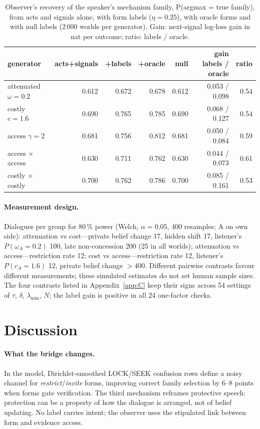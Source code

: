 \documentclass[runningheads]{llncs}
\begin{document}
\begin{table}[t]
\centering\caption{Observer's recovery of the speaker's mechanism family, P(argmax = true family), from acts and signals alone, with form labels ($\eta=0.25$), with oracle forms and with null labels (2\,000 worlds per generator). Gain: next-signal log-loss gain in nat per outcome; ratio: labels / oracle.}
\label{tab:labels_gain}
\footnotesize
\begin{tabular}{@{}lrrrrrr@{}}
\toprule
generator & acts+signals & +labels & +oracle & null & gain labels / oracle & ratio\\
\midrule
attenuated $\omega{=}0.2$ & 0.612 & 0.672 & 0.678 & 0.612 & 0.053 / 0.098 & 0.54\\
costly $c{=}1.6$ & 0.690 & 0.765 & 0.785 & 0.690 & 0.068 / 0.127 & 0.54\\
access $\gamma{=}2$ & 0.681 & 0.756 & 0.812 & 0.681 & 0.050 / 0.084 & 0.59\\
access $\times$ access & 0.630 & 0.711 & 0.762 & 0.630 & 0.044 / 0.073 & 0.61\\
costly $\times$ costly & 0.700 & 0.762 & 0.786 & 0.700 & 0.085 / 0.161 & 0.53\\
\bottomrule
\end{tabular}
\end{table}

\paragraph{Measurement design.} Dialogues per group for 80\,\% power (Welch, $\alpha=0.05$, 400 resamples; A on own side): attenuation vs cost---private belief change 17, hidden shift 17, listener's $P(\omega_A{=}0.2)$ 100, late non-concession 200 (25 in all worlds); attenuation vs access---restriction rate 12; cost vs access---restriction rate 12, listener's $P(c_A{=}1.6)$ 12, private belief change $>400$. Different pairwise contrasts favour different measurements; these simulated estimates do not set human sample sizes. The four contrasts listed in Appendix~\ref{app:C} keep their signs across 54 settings of $\tau$, $\delta$, $\lambda_{\min}$, $N$; the label gain is positive in all 24 one-factor checks.

\section{Discussion}
\paragraph{What the bridge changes.} In the model, Dirichlet-smoothed LOCK/SEEK confusion rows define a noisy channel for \emph{restrict}/\emph{invite} forms, improving correct family selection by 6--8 points when forms gate verification. The third mechanism reframes protective speech: protection can be a property of how the dialogue is arranged, not of belief updating. No label carries intent; the observer uses the stipulated link between form and evidence access.
\end{document}

